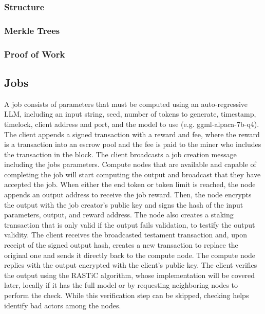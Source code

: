 \documentclass{article}
\begin{document}
\subsubsection{Structure}
\subsubsection{Merkle Trees}
\subsubsection{Proof of Work}

\subsection{Jobs}
A job consists of parameters that must be computed using an auto-regressive LLM, including an input string, seed, number of tokens to generate, timestamp, timelock, client address and port, and the model to use (e.g. ggml-alpaca-7b-q4). 
The client appends a signed transaction with a reward and fee, where the reward is a transaction into an escrow pool and the fee is paid to the miner who includes the transaction in the block. 
The client broadcasts a job creation message including the jobs parameters.
Compute nodes that are available and capable of completing the job will start computing the output and broadcast that they have accepted the job. 
When either the end token or token limit is reached, the node appends an output address to receive the job reward. 
Then, the node encrypts the output with the job creator's public key and signs the hash of the input parameters, output, and reward address. 
The node also creates a staking transaction that is only valid if the output fails validation, to testify the output validity. 
The client receives the broadcasted testament transaction and, upon receipt of the signed output hash, creates a new transaction to replace the original one and sends it directly back to the compute node. 
The compute node replies with the output encrypted with the client's public key. 
The client verifies the output using the RASTiC algorithm, whose implementation will be covered later, locally if it has the full model or by requesting neighboring nodes to perform the check. While this verification step can be skipped, checking helps identify bad actors among the nodes.
\end{document}
